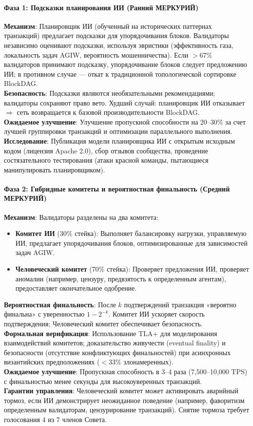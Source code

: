 \documentclass[11pt]{article}
\begin{document}
\paragraph{Фаза 1: Подсказки планирования ИИ (Ранний МЕРКУРИЙ)}
\textbf{Механизм}: Планировщик ИИ (обученный на исторических паттернах транзакций) предлагает подсказки для упорядочивания блоков. Валидаторы независимо оценивают подсказки, используя эвристики (эффективность газа, локальность задач AGIW, вероятность мошенничества). Если $>67\%$ валидаторов принимают подсказку, упорядочивание блоков следует предложению ИИ; в противном случае — откат к традиционной топологической сортировке BlockDAG.\\
\textbf{Безопасность}: Подсказки являются необязательными рекомендациями; валидаторы сохраняют право вето. Худший случай: планировщик ИИ отказывает $\Rightarrow$ сеть возвращается к базовой производительности BlockDAG.\\
\textbf{Ожидаемое улучшение}: Улучшение пропускной способности на 20--30\% за счет лучшей группировки транзакций и оптимизации параллельного выполнения.\\
\textbf{Исследование}: Публикация модели планировщика ИИ с открытым исходным кодом (лицензия Apache 2.0), сбор отзывов сообщества, проведение состязательного тестирования (атаки красной команды, пытающиеся манипулировать планировщиком).

\paragraph{Фаза 2: Гибридные комитеты и вероятностная финальность (Средний МЕРКУРИЙ)}
\textbf{Механизм}: Валидаторы разделены на два комитета:
\begin{itemize}[noitemsep]
  \item \textbf{Комитет ИИ} (30\% стейка): Выполняет балансировку нагрузки, управляемую ИИ, предлагает упорядочивания блоков, оптимизированные для зависимостей задач AGIW.
  \item \textbf{Человеческий комитет} (70\% стейка): Проверяет предложения ИИ, проверяет аномалии (например, цензуру, предвзятость к определенным агентам), предоставляет окончательное одобрение.
\end{itemize}
\textbf{Вероятностная финальность}: После $k$ подтверждений транзакция «вероятно финальна» с уверенностью $1 - 2^{-k}$. Комитет ИИ ускоряет скорость подтверждения; Человеческий комитет обеспечивает безопасность.\\
\textbf{Формальная верификация}: Использование TLA+ для моделирования взаимодействий комитетов; доказательство живучести (eventual finality) и безопасности (отсутствие конфликтующих финальностей) при асинхронных византийских предположениях ($<33\%$ злонамеренных).\\
\textbf{Ожидаемое улучшение}: Пропускная способность в 3--4 раза (7,500--10,000 TPS) с финальностью менее секунды для высокоуверенных транзакций.\\
\textbf{Гарантии управления}: Человеческий комитет может активировать аварийный тормоз, если ИИ демонстрирует неожиданное поведение (например, фаворитизм определенным валидаторам, цензурирование транзакций). Снятие тормоза требует голосования 4 из 7 членов Совета.
\end{document}
